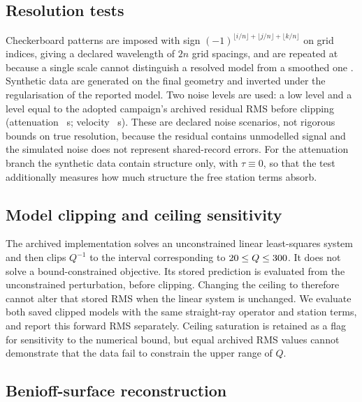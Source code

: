 \documentclass[review,authoryear,longtitle]{elsarticle}
\begin{document}
\subsection{Resolution tests}

Checkerboard patterns are imposed with sign
$(-1)^{\lfloor i/n\rfloor + \lfloor j/n\rfloor + \lfloor k/n\rfloor}$ on
grid indices, giving a declared wavelength of $2n$ grid spacings, and are
repeated at \damLambdas{} because a single scale cannot distinguish a
resolved model from a smoothed one \citep{Leveque1993,Rawlinson2016}.
Synthetic data are generated on the final geometry and inverted under the
regularisation of the reported model. Two noise levels are used: a low
level and a level equal to the adopted campaign's archived residual RMS
before clipping (attenuation \rmsFinalAdoptada~s; velocity
\vpRmsAdoptada~s). These are declared
noise scenarios, not rigorous bounds on true resolution, because the
residual contains unmodelled signal and the simulated noise does not
represent shared-record errors. For the attenuation branch the synthetic data
contain structure only, with $\tau\equiv0$, so that the test additionally
measures how much structure the free station terms absorb.

\subsection{Model clipping and ceiling sensitivity}

The archived implementation solves an unconstrained linear least-squares
system and then clips $Q^{-1}$ to the interval corresponding to
$20\le Q\le300$. It does not solve a bound-constrained objective.
Its stored prediction is evaluated from the unconstrained perturbation,
before clipping. Changing the ceiling to \qTechoPrueba{} therefore cannot
alter that stored RMS when the linear system is unchanged.
We evaluate both saved clipped models with the same straight-ray operator
and station terms, and report this forward RMS separately. Ceiling
saturation is retained as a flag for sensitivity to the numerical bound,
but equal archived RMS values cannot demonstrate that the data fail to
constrain the upper range of $Q$.

\subsection{Benioff-surface reconstruction}
\end{document}
